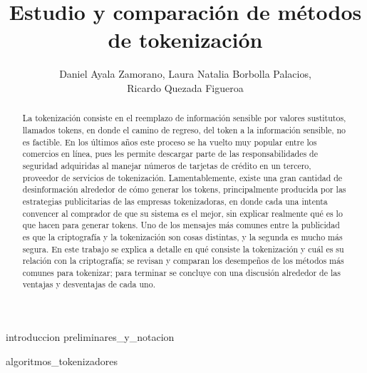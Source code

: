 \documentclass[11pt]{llncs}
\begin{document}
  \title{Estudio y comparación de métodos de tokenización}
  \author{Daniel Ayala Zamorano,
     Laura Natalia Borbolla Palacios, \\
     Ricardo Quezada Figueroa}
  \maketitle

  \begin{abstract}
    La tokenización consiste en el reemplazo de información sensible por valores
    sustitutos, llamados tokens, en donde el camino de regreso, del  token a la
    información sensible, no es factible. En los últimos años este proceso se ha
    vuelto muy popular entre los comercios en línea, pues les permite descargar
    parte de las responsabilidades de seguridad adquiridas al manejar números de
    tarjetas de crédito en un tercero, proveedor de servicios de tokenización.
    Lamentablemente, existe una gran cantidad de desinformación alrededor de
    cómo generar los tokens, principalmente producida por las estrategias
    publicitarias de las empresas tokenizadoras, en donde cada una intenta
    convencer al comprador de que su sistema es el mejor, sin explicar realmente
    qué es lo que hacen para generar tokens. Uno de los mensajes más comunes
    entre la publicidad es que la criptografía y la tokenización son cosas
    distintas, y la segunda es mucho más segura. En este trabajo se explica a
    detalle en qué consiste la tokenización y cuál es su relación con la
    criptografía; se revisan y comparan los desempeños de los métodos más comunes
    para tokenizar; para terminar se concluye con una discusión alrededor de las
    ventajas y desventajas de cada uno.
  \end{abstract}

  {introduccion}
  {preliminares_y_notacion}
  
    {algoritmos_tokenizadores}
\end{document}
